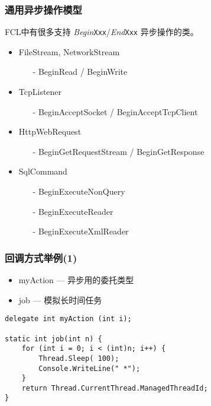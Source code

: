 \begin{frame}
\frametitle{通用异步操作模型}

FCL中有很多支持 \textit{Begin}\texttt{Xxx}/\textit{End}\texttt{Xxx} 异步操作的类。

\begin{itemize}
\setlength{\itemsep}{6pt plus 1pt}
\item FileStream, NetworkStream
\begin{itemize}
\item[-] BeginRead / BeginWrite
\end{itemize}
\item TcpListener
\begin{itemize}
\item[-] BeginAcceptSocket / BeginAcceptTcpClient
\end{itemize}
\item HttpWebRequest
\begin{itemize}
\item[-] BeginGetRequestStream / BeginGetResponse
\end{itemize}
\item SqlCommand
\begin{itemize}
\item[-] BeginExecuteNonQuery
\item[-] BeginExecuteReader
\item[-] BeginExecuteXmlReader
\end{itemize}
\end{itemize}
\end{frame}

\begin{frame}[fragile]
\frametitle{回调方式举例(1)}

\begin{itemize}
\item myAction --- 异步用的委托类型
\item job --- 模拟长时间任务
\end{itemize}
\begin{lstlisting}
delegate int myAction (int i);

static int job(int n) {
    for (int i = 0; i < (int)n; i++) {
        Thread.Sleep( 100);
        Console.WriteLine(" *");
    }
    return Thread.CurrentThread.ManagedThreadId;
}
\end{lstlisting}
\end{frame}

